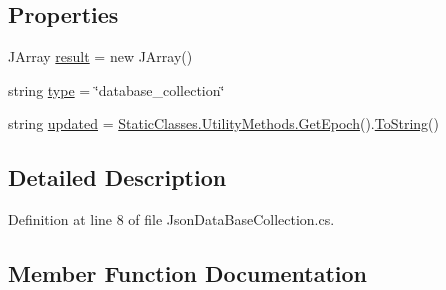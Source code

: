 \subsection*{Properties}
\begin{DoxyCompactItemize}
\item 
J\+Array \mbox{\hyperlink{class_little_weeb_library_1_1_models_1_1_json_data_base_collection_a5dd052bee11a80bb2794594ec7a1a772}{result}} = new J\+Array()
\item 
string \mbox{\hyperlink{class_little_weeb_library_1_1_models_1_1_json_data_base_collection_ada1f636f42040ebdd7a96b7a388afa7d}{type}} = \char`\"{}database\+\_\+collection\char`\"{}
\item 
string \mbox{\hyperlink{class_little_weeb_library_1_1_models_1_1_json_data_base_collection_a650eb5da20f77813da3d4f4fae56bf3b}{updated}} = \mbox{\hyperlink{class_little_weeb_library_1_1_static_classes_1_1_utility_methods_a12336d9e64983ddabaad8950486fafb2}{Static\+Classes.\+Utility\+Methods.\+Get\+Epoch}}().\mbox{\hyperlink{class_little_weeb_library_1_1_models_1_1_json_data_base_collection_ac50c3070bcc5af0ca9f223bb88a1ef6c}{To\+String}}()
\end{DoxyCompactItemize}


\subsection{Detailed Description}


Definition at line 8 of file Json\+Data\+Base\+Collection.\+cs.



\subsection{Member Function Documentation}
\mbox{\label{class_little_weeb_library_1_1_models_1_1_json_data_base_collection_a2df5ba56e4691271213328b9bc2dbb1f}} 
